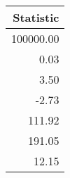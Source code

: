 \begin{tabular}{r}
\toprule
 Statistic \\
\midrule
 100000.00 \\
      0.03 \\
      3.50 \\
     -2.73 \\
    111.92 \\
    191.05 \\
     12.15 \\
\bottomrule
\end{tabular}
